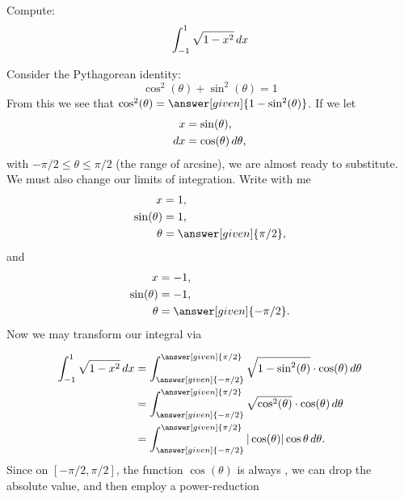 \documentclass{ximera}
\begin{document}
\begin{example}
  Compute:
  \[
  \int_{-1}^1 \sqrt{1-x^2} \mathop{}\!d x
  \]
  \begin{explanation}
    Consider the Pythagorean identity:
    \[
    \cos^2(\theta) + \sin^2(\theta) = 1
    \]
    From this we see that $\cos^2(\theta)=
    \answer[given]{1-\sin^2(\theta)}$.  If we let
    \begin{align*}
      x &=\sin(\theta),\\
      \mathop{}\!d x &= \cos(\theta) \mathop{}\!d\theta,
    \end{align*}
    with $-\pi/2\le \theta\le \pi/2$ (the range of arcsine), we are
    almost ready to substitute. We must also change our limits of
    integration. Write with me
    \begin{align*}
      x &= 1,\\
      \sin(\theta) &= 1,\\
      \theta &= \answer[given]{\pi/2},
    \end{align*}
    and
    \begin{align*}
      x &= -1,\\
      \sin(\theta) &= -1,\\
      \theta &= \answer[given]{-\pi/2}.
    \end{align*}
    Now we may transform our integral via
    \begin{image}
    \end{image}
    \begin{align*}
      \int_{-1}^1\sqrt{1-x^2} \d x &= \int_{\answer[given]{-\pi/2}}^{\answer[given]{\pi/2}} \sqrt{1-\sin^2(\theta)} \cdot \cos(\theta) \d \theta \\
      &= \int_{\answer[given]{-\pi/2}}^{\answer[given]{\pi/2}} \sqrt{\cos^2(\theta)}\cdot \cos(\theta) \d\theta \\
      &=\int_{\answer[given]{-\pi/2}}^{\answer[given]{\pi/2}} |\cos(\theta)| \cos\theta \d\theta.
    \end{align*}
    Since on $[-\pi/2,\pi/2]$, the function $\cos(\theta)$ is always
    ,
    we can drop the absolute value, and then employ a power-reduction

\end{explanation}
\end{example}
\end{document}
